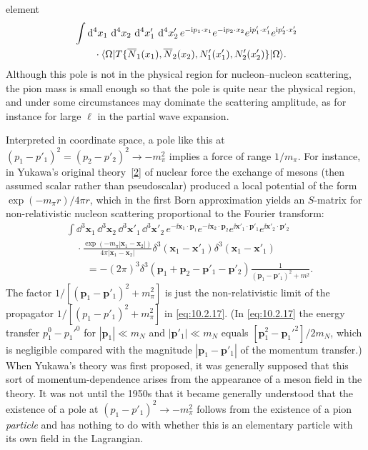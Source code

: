 
element
\begin{align*}
&\int \mathop{}\!\mathrm{d}^4x_1\,\mathop{}\!\mathrm{d}^4x_2\,\mathop{}\!\mathrm{d}^4x'_1\,\mathop{}\!\mathrm{d}^4x'_2\,
e^{-\mathrm{i} p_1\cdot x_1}e^{-\mathrm{i} p_2\cdot x_2}
e^{\mathrm{i} p'_1\cdot x'_1}e^{\mathrm{i} p'_2\cdot x'_2}
\\
&\qquad\cdot
\langle \Omega\rvert T\{\overline N_1(x_1),\overline N_2(x_2),
N'_1(x'_1),N'_2(x'_2)\}\lvert \Omega\rangle.
\end{align*}
Although this pole is not in the physical region for nucleon--nucleon
scattering, the pion mass is small enough so that the pole is quite near the
physical region, and under some circumstances may dominate the scattering
amplitude, as for instance for large $\ell$ in the partial wave expansion.

Interpreted in coordinate space, a pole like this at
$(p_1-p'_1)^2=(p_2-p'_2)^2\to-m_\pi^2$ implies a force of range $1/m_\pi$.
For instance, in Yukawa's original theory~\hyperref[ref:10.2]{[2]} of nuclear
force the exchange of mesons (then assumed scalar rather than pseudoscalar)
produced a local potential of the form $\exp(-m_\pi r)/4\pi r$, which in the
first Born approximation yields an $S$-matrix for non-relativistic nucleon
scattering proportional to the Fourier transform:
\begin{align*}
&\int \dd^3\mathbf x_1\,\dd^3\mathbf x_2\,\dd^3\mathbf x'_1\,\dd^3\mathbf x'_2\,
e^{-\ii\mathbf x_1\cdot\mathbf p_1}e^{-\ii\mathbf x_2\cdot\mathbf p_2}
e^{\ii\mathbf x'_1\cdot\mathbf p'_1}e^{\ii\mathbf x'_2\cdot\mathbf p'_2}
\\
&\quad\cdot
\frac{\exp(-m_\pi|\mathbf x_1-\mathbf x_2|)}
{4\pi|\mathbf x_1-\mathbf x_2|}
\delta^3(\mathbf x_1-\mathbf x'_1)\delta^3(\mathbf x_1-\mathbf x'_1)
\\
&\qquad=-(2\pi)^3\delta^3(\mathbf p_1+\mathbf p_2-
\mathbf p'_1-\mathbf p'_2)\frac{1}{(\mathbf p_1-\mathbf p'_1)^2+m^2}.
\end{align*}
The factor $1/[(\mathbf p_1-\mathbf p'_1)^2+m_\pi^2]$ is just the
non-relativistic limit of the propagator
$1/[(p_1-p'_1)^2+m_\pi^2]$ in \eqref{eq:10.2.17}. (In \eqref{eq:10.2.17}
the energy transfer $p_1^0-p_1'^0$ for $|\mathbf p_1|\ll m_N$ and
$|\mathbf p'_1|\ll m_N$ equals
$[\mathbf p_1^2-\mathbf p_1'^2]/2m_N$, which is negligible compared with the
magnitude $|\mathbf p_1-\mathbf p'_1|$ of the momentum transfer.) When
Yukawa's theory was first proposed, it was generally supposed that this sort
of momentum-dependence arises from the appearance of a meson field in the
theory. It was not until the 1950s that it became generally understood that
the existence of a pole at $(p_1-p'_1)^2\to-m_\pi^2$ follows from the
existence of a pion \emph{particle} and has nothing to do with whether this is
an elementary particle with its own field in the Lagrangian.

